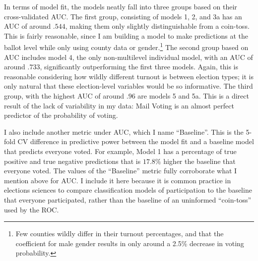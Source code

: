 \documentclass[12pt,twoside]{reedthesis}
\begin{document}
  In terms of model fit, the models neatly fall into three groups based on
  their cross-validated AUC. The first group, consisting of models 1, 2,
  and 3a has an AUC of around \(.544\), making them only slightly
  distinguishable from a coin-toss. This is fairly reasonable, since I am
  building a model to make predictions at the ballot level while only
  using county data or gender.\footnote{Few counties wildly differ in
    their turnout percentages, and that the coefficient for male gender
    results in only around a 2.5\% decrease in voting probability.} The
  second group based on AUC includes model 4, the only non-multilevel
  individual model, with an AUC of around \(.733\), significantly
  outperforming the first three models. Again, this is reasonable
  considering how wildly different turnout is between election types; it
  is only natural that these election-level variables would be so
  informative. The third group, with the highest AUC of around \(.96\) are
  models 5 and 5a. This is a direct result of the lack of variability in
  my data: Mail Voting is an almost perfect predictor of the probability
  of voting.
  
  I also include another metric under AUC, which I name ``Baseline''. This
  is the 5-fold CV difference in predictive power between the model fit
  and a baseline model that predicts everyone voted. For example, Model 1
  has a percentage of true positive and true negative predictions that is
  \(17.8\%\) higher the baseline that everyone voted. The values of the
  ``Baseline'' metric fully corroborate what I mention above for AUC. I
  include it here because it is common practice in elections sciences to
  compare classification models of participation to the baseline that
  everyone participated, rather than the baseline of an uninformed
  ``coin-toss'' used by the ROC.
  
\end{document}

